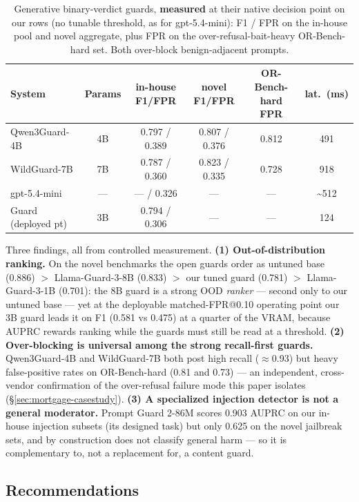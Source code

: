 \begin{table}[t]
\small\centering\setlength{\tabcolsep}{4pt}
\caption{Generative binary-verdict guards, \textbf{measured} at their native decision point on our rows (no tunable threshold, as for gpt-5.4-mini): F1 / FPR on the in-house pool and novel aggregate, plus FPR on the over-refusal-bait-heavy OR-Bench-hard set. Both over-block benign-adjacent prompts.}
\label{tab:gr-native}
\begin{tabular}{lccccc}
\toprule
System & Params & in-house F1/FPR & novel F1/FPR & OR-Bench-hard FPR & lat.\ (ms) \\
\midrule
Qwen3Guard-4B & 4B & 0.797 / 0.389 & 0.807 / 0.376 & 0.812 & 491 \\
WildGuard-7B  & 7B & 0.787 / 0.360 & 0.823 / 0.335 & 0.728 & 918 \\
gpt-5.4-mini  & --- & --- / 0.326 & --- & --- & \textasciitilde{}512 \\
Guard (deployed pt) & 3B & 0.794 / 0.306 & --- & --- & 124 \\
\bottomrule
\end{tabular}
\end{table}

Three findings, all from controlled measurement. \textbf{(1) Out-of-distribution ranking.} On the novel benchmarks the open guards order as untuned base (0.886) $>$ Llama-Guard-3-8B (0.833) $>$ our tuned guard (0.781) $>$ Llama-Guard-3-1B (0.701): the 8B guard is a strong OOD \emph{ranker} --- second only to our untuned base --- yet at the deployable matched-FPR@0.10 operating point our 3B guard leads it on F1 (0.581 vs 0.475) at a quarter of the VRAM, because AUPRC rewards ranking while the guards must still be read at a threshold. \textbf{(2) Over-blocking is universal among the strong recall-first guards.} Qwen3Guard-4B and WildGuard-7B both post high recall ($\approx$0.93) but heavy false-positive rates on OR-Bench-hard (0.81 and 0.73) --- an independent, cross-vendor confirmation of the over-refusal failure mode this paper isolates (\S\ref{sec:mortgage-casestudy}). \textbf{(3) A specialized injection detector is not a general moderator.} Prompt Guard 2-86M scores 0.903 AUPRC on our in-house injection subsets (its designed task) but only 0.625 on the novel jailbreak sets, and by construction does not classify general harm --- so it is complementary to, not a replacement for, a content guard.

\subsection{Recommendations}
\label{sec:recommendations}

